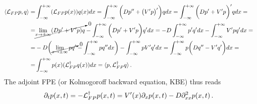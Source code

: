 \documentclass[../main.tex]{subfiles}
\begin{document}
\begin{align*}
      \langle \mathcal{L}_{FP}p,q\rangle =& \int_{-\infty}^{+\infty}(\mathcal{L}_{FP}p(x))q(x)dx= \int_{-\infty}^{+\infty}\bigg(D p'' + \big(V'p\big)'\bigg)qdx = \int_{-\infty}^{+\infty}\bigg(D p'+V'p\bigg)'q dx = \nonumber \\
      =& \cancelto{0}{\lim_{x\to\pm\infty}(D p'+V'p)q} - \int_{-\infty}^{+\infty}\bigg(D p'+V'p\bigg)q' dx = -D \int_{-\infty}^{+\infty}p'q'dx -\int_{-\infty}^{+\infty}V'p q'dx =  \nonumber \\
      =& -D\bigg(\cancelto{0}{\lim_{x\to\pm\infty}p q'}-\int_{-\infty}^{+\infty}p q''dx\bigg)-\int_{-\infty}^{+\infty}p V'q'dx = \int_{-\infty}^{+\infty}p\bigg(D q''-V'q'\bigg)dx = \nonumber \\
      =& \int_{-\infty}^{+\infty}p(x)(\mathcal{L}^{\dagger}_{FP}q(x))dx = \langle p,\mathcal{L}^{\dagger}_{FP}q\rangle\,.
\end{align*}
The adjoint FPE (or Kolmogoroff backward equation, KBE) thus reads
\begin{equation}\label{eq2.4.1.2.2}
     \partial_{t}p(x,t)=-\mathcal{L}^{\dagger}_{FP}p(x,t)=V'(x)\partial_{x}p(x,t) - D\partial^{2}_{xx}p(x,t)\,.
\end{equation}
\end{document}
